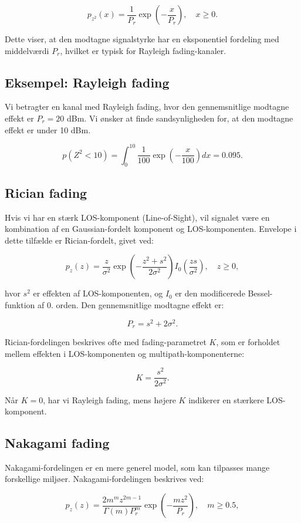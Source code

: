 \documentclass[a4paper,12pt]{book}
\begin{document}
	\[
	p_{z^2}(x) = \frac{1}{P_r} \exp\left(-\frac{x}{P_r}\right), \quad x \geq 0.
	\]
	
	Dette viser, at den modtagne signalstyrke har en eksponentiel fordeling med middelværdi $P_r$, hvilket er typisk for Rayleigh fading-kanaler.
	
	\subsection{Eksempel: Rayleigh fading}
	Vi betragter en kanal med Rayleigh fading, hvor den gennemsnitlige modtagne effekt er $P_r = 20$ dBm. Vi ønsker at finde sandsynligheden for, at den modtagne effekt er under 10 dBm.
	
	\[
	p(Z^2 < 10) = \int_0^{10} \frac{1}{100} \exp\left(-\frac{x}{100}\right) dx = 0.095.
	\]
	
	\subsection{Rician fading}
	Hvis vi har en stærk LOS-komponent (Line-of-Sight), vil signalet være en kombination af en Gaussian-fordelt komponent og LOS-komponenten. Envelope i dette tilfælde er Rician-fordelt, givet ved:
	
	\[
	p_z(z) = \frac{z}{\sigma^2} \exp\left( -\frac{z^2 + s^2}{2\sigma^2} \right) I_0\left( \frac{zs}{\sigma^2} \right), \quad z \geq 0,
	\]
	
	hvor $s^2$ er effekten af LOS-komponenten, og $I_0$ er den modificerede Bessel-funktion af 0. orden. Den gennemsnitlige modtagne effekt er:
	
	\[
	P_r = s^2 + 2\sigma^2.
	\]
	
	Rician-fordelingen beskrives ofte med fading-parametret $K$, som er forholdet mellem effekten i LOS-komponenten og multipath-komponenterne:
	
	\[
	K = \frac{s^2}{2\sigma^2}.
	\]
	
	Når $K = 0$, har vi Rayleigh fading, mens højere $K$ indikerer en stærkere LOS-komponent.
	
	\subsection{Nakagami fading}
	Nakagami-fordelingen er en mere generel model, som kan tilpasses mange forskellige miljøer. Nakagami-fordelingen beskrives ved:
	
	\[
	p_z(z) = \frac{2m^m z^{2m-1}}{\Gamma(m) P_r^m} \exp\left( -\frac{mz^2}{P_r} \right), \quad m \geq 0.5,
	\]
	
\end{document}
